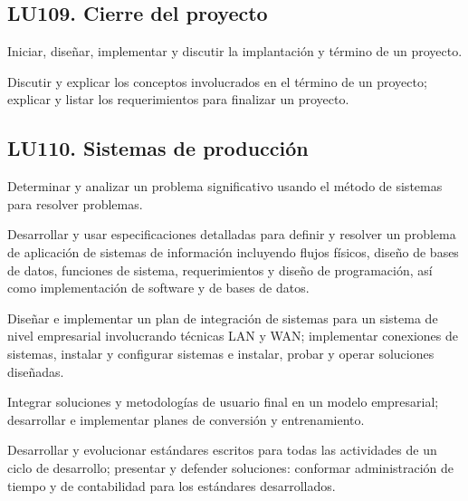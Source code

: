 \subsection{LU109. Cierre del proyecto}\label{sec:BOK-LU109}\label{sec:LU109}
\begin{LearningUnit}
\begin{LUGoal}
\item Iniciar, diseñar, implementar y discutir la implantación y término de un proyecto.
\end{LUGoal}

\begin{LUObjective}
\item Discutir y explicar los conceptos involucrados en el término de un proyecto; explicar y listar los requerimientos para finalizar un proyecto.
\end{LUObjective}
\end{LearningUnit}

\subsection{LU110. Sistemas de producción}\label{sec:BOK-LU110}\label{sec:LU110}
\begin{LearningUnit}
\begin{LUGoal}
\item Determinar y analizar un problema significativo usando el método de sistemas para resolver problemas.
\end{LUGoal}

\begin{LUObjective}
\item Desarrollar y usar especificaciones detalladas para definir y resolver un problema de aplicación de sistemas de información incluyendo flujos físicos, diseño de bases de datos, funciones de sistema, requerimientos y diseño de programación, así como  implementación de software y de bases de datos.
\item Diseñar e implementar un plan de integración de sistemas para un sistema de nivel empresarial involucrando técnicas LAN y WAN; implementar conexiones de sistemas, instalar y configurar sistemas e instalar, probar y operar soluciones diseñadas.
\item Integrar soluciones y metodologías de usuario final en un modelo empresarial; desarrollar e implementar planes de conversión y entrenamiento.
\item Desarrollar y evolucionar estándares escritos para todas las actividades de un ciclo de desarrollo; presentar y defender soluciones: conformar administración de tiempo y de contabilidad para los estándares desarrollados.
\end{LUObjective}
\end{LearningUnit}

